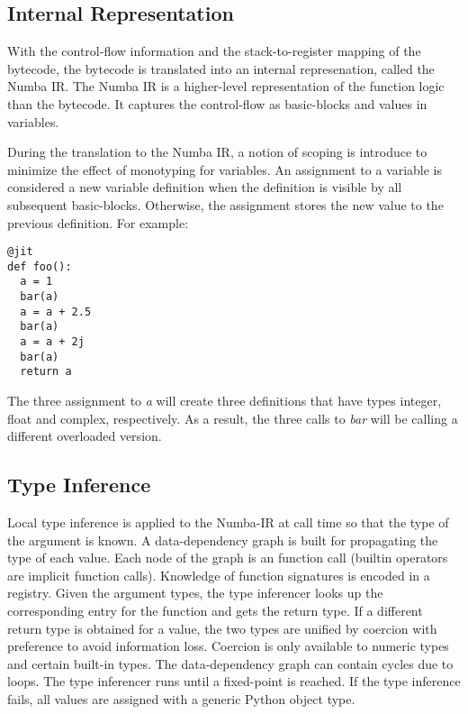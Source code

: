 \documentclass{acm_proc_article-sp}
\begin{document}
\subsection{Internal Representation}

With the control-flow information and the stack-to-register mapping
of the bytecode, the bytecode is translated into an internal represenation,
called the Numba IR. The Numba IR is a higher-level representation of the
function logic than the bytecode. It captures the control-flow as basic-blocks
and values in variables.

During the translation to the Numba IR, a notion of scoping is introduce to
minimize the effect of monotyping for variables. An assignment to a variable
is considered a new variable definition when the definition is visible by all
subsequent basic-blocks. Otherwise, the assignment stores the new value to
the previous definition.  For example:

\begin{lstlisting}
@jit
def foo():
  a = 1
  bar(a)
  a = a + 2.5
  bar(a)
  a = a + 2j
  bar(a)
  return a
\end{lstlisting}

The three assignment to \textit{a} will create three definitions that have
types integer, float and complex, respectively.  As a result, the three
calls to \textit{bar} will be calling a different overloaded version.

\subsection{Type Inference}

Local type inference is applied to the Numba-IR at call time so that
the type of the argument is known. A data-dependency graph is built for
propagating the type of each value.  Each node of the graph is an function call
(builtin operators are implicit function calls). Knowledge of function
signatures is encoded in a registry.
Given the argument types, the type inferencer looks up
the corresponding entry for the function and gets the return type. If a
different return type is obtained for a value, the two types are unified by
coercion with preference to avoid information loss. Coercion is only available
to numeric types and certain built-in types. The data-dependency graph can
contain cycles due to loops. The type inferencer runs until a fixed-point is
reached. If the type inference fails, all values are assigned with a generic
Python object type.
\end{document}
